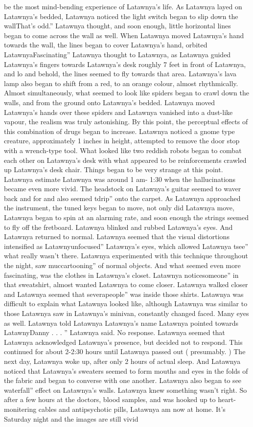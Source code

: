 \documentclass[12pt]{book}
\begin{document}
be the most mind-bending experience of Latawnya's life. As Latawnya layed on Latawnya's bedded, Latawnya noticed the light switch began to slip down the wallThat's odd.'' Latawnya thought, and soon enough, little horizontal lines began to come across the wall as well. When Latawnya moved Latawnya's hand towards the wall, the lines began to cover Latawnya's hand, orbited LatawnyaFascinating'' Latawnya thought to Latawnya, as Latawnya guided Latawnya's fingers towards Latawnya's desk roughly 7 feet in front of Latawnya, and lo and behold, the lines seemed to fly towards that area. Latawnya's lava lamp also began to shift from a red, to an orange colour, almost rhythmically. Almost simultaneously, what seemed to look like spiders began to crawl down the walls, and from the ground onto Latawnya's bedded. Latawnya moved Latawnya's hands over these spiders and Latawnya vanished into a dust-like vapour, the realism was truly astonishing. By this point, the perceptual effects of this combination of drugs began to increase. Latawnya noticed a gnome type creature, approximately 1  inches in height, attempted to remove the door stop with a wrench-type tool. What looked like two reddish robots began to combat each other on Latawnya's desk with what appeared to be reinforcements crawled up Latawnya's desk chair. Things began to be very strange at this point. Latawnya estimate Latawnya was around 1 am- 1:30 when the hallucinations became even more vivid. The headstock on Latawnya's guitar seemed to waver back and for and also seemed tdrip'' onto the carpet. As Latawnya approached the instrument, the tuned keys began to move, not only did Latawnya move, Latawnya began to spin at an alarming rate, and soon enough the strings seemed to fly off the fretboard. Latawnya blinked and rubbed Latawnya's eyes. And Latawnya returned to normal. Latawnya seemed that the visual distortions intensified as Latawnyunfocused'' Latawnya's eyes, which allowed Latawnya tsee'' what really wasn't there. Latawnya experimented with this technique throughout the night, saw muccartooning'' of normal objects. And what seemed even more fascinating, was the clothes in Latawnya's closet. Latawnya noticesomeone'' in that sweatshirt, almost wanted Latawnya to come closer. Latawnya walked closer and Latawnya seemed that severapeople'' was inside those shirts. Latawnya was difficult to explain what Latawnya looked like, although Latawnya was similar to those Latawnya saw in Latawnya's minivan, constantly changed faced. Many eyes as well. Latawnya told Latawnya Latawnya's name Latawnya pointed towards LatawnyDanny . . . '' Latawnya said. No response. Latawnya seemed that Latawnya acknowledged Latawnya's presence, but decided not to respond. This continued for about 2-2:30 hours until Latawnya passed out ( presumably. ) The next day, Latawnya woke up, after only 2 hours of actual sleep. And Latawnya noticed that Latawnya's sweaters seemed to form mouths and eyes in the folds of the fabric and began to converse with one another. Latawnya also began to see waterfall'' effect on Latawnya's walls. Latawnya knew something wasn't right. So after a few hours at the doctors, blood samples, and was hooked up to heart-monitering cables and antipsychotic pills, Latawnya am now at home. It's Saturday night and the images are still vivid 
\end{document}
